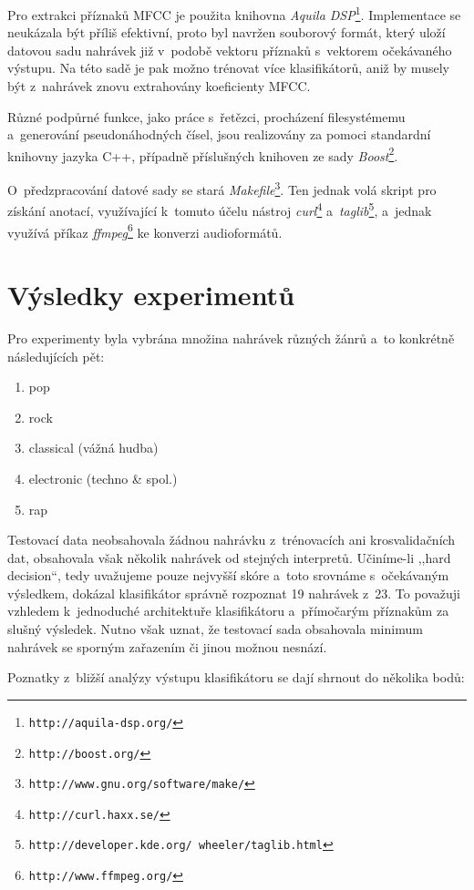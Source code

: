 \documentclass[10pt,a4paper]{article}
\begin{document}
Pro extrakci příznaků MFCC je použita knihovna \emph{Aquila DSP}\footnote{\texttt{http://aquila-dsp.org/}}.
Implementace se neukázala být příliš efektivní, proto byl navržen souborový formát,
který uloží datovou sadu nahrávek již v~podobě vektoru příznaků s~vektorem očekávaného výstupu.
Na této sadě je pak možno trénovat více klasifikátorů, aniž by musely být z~nahrávek
znovu extrahovány koeficienty MFCC.

Různé podpůrné funkce, jako práce s~řetězci, procházení filesystémemu a~generování pseudonáhodných čísel, jsou realizovány
za pomoci standardní knihovny jazyka C++, případně příslušných knihoven ze sady \emph{Boost}\footnote{\texttt{http://boost.org/}}.

O~předzpracování datové sady se stará \emph{Makefile}\footnote{\texttt{http://www.gnu.org/software/make/}}.
Ten jednak volá skript pro získání anotací, využívající k~tomuto účelu nástroj \emph{curl}\footnote{\texttt{http://curl.haxx.se/}}
a~\emph{taglib}\footnote{\texttt{http://developer.kde.org/~wheeler/taglib.html}},
a~jednak využívá příkaz \emph{ffmpeg}\footnote{\texttt{http://www.ffmpeg.org/}} ke konverzi audioformátů.

\section{Výsledky experimentů}

Pro experimenty byla vybrána množina nahrávek různých žánrů a~to konkrétně následujících pět:

\begin{enumerate}
\item pop
\item rock
\item classical (vážná hudba)
\item electronic (techno \& spol.)
\item rap
\end{enumerate}

Testovací data neobsahovala žádnou nahrávku z~trénovacích ani krosvalidačních dat,
obsahovala však několik nahrávek od stejných interpretů.
Učiníme-li ,,hard decision``, tedy uvažujeme pouze nejvyšší skóre a~toto srovnáme
s~očekávaným výsledkem, dokázal klasifikátor správně rozpoznat 19 nahrávek z~23.
To považuji vzhledem k~jednoduché architektuře klasifikátoru a~přímočarým příznakům
za slušný výsledek. Nutno však uznat, že testovací sada obsahovala minimum
nahrávek se sporným zařazením či jinou možnou nesnází.

\newpage
Poznatky z~bližší analýzy výstupu klasifikátoru se dají
shrnout do několika bodů:
\end{document}
